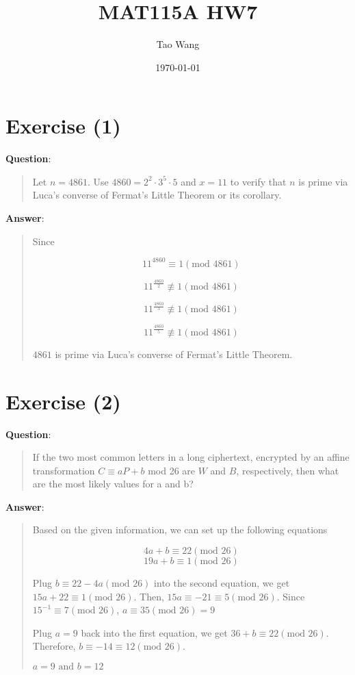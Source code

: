 \documentclass{article} %
\begin{document}
\title{MAT115A HW7}
\author{Tao Wang}
\date{\today}

\maketitle

\section*{Exercise (1)}

\bigskip
\noindent
\textbf{Question}:
\begin{quote}
    Let $n = 4861$. Use $4860 = 2^2 \cdot 3^5 \cdot  5$ and $x = 11$ to verify that $n$ is prime via
    Luca’s converse of Fermat’s Little Theorem or its corollary.
\end{quote}

\bigskip
\noindent
\textbf{Answer}:
\begin{quote}
    Since

    \[11^{4860} \equiv 1(\text{mod }4861)\]

    \[11^{\frac{4860}{2}}\not \equiv 1(\text{mod }4861)\]

    \[11^{\frac{4860}{3}}\not \equiv 1(\text{mod }4861)\]

    \[11^{\frac{4860}{5}}\not \equiv 1(\text{mod }4861)\]

    $4861$ is prime via Luca's converse of Fermat's Little Theorem.
\end{quote}

\section*{Exercise (2)}

\bigskip
\noindent
\textbf{Question}:
\begin{quote}
    If the two most common letters in a long ciphertext, encrypted by an affine
    transformation $C \equiv aP + b$ mod 26 are $W$ and $B$, respectively, then what are
    the most likely values for a and b?
\end{quote}

\bigskip
\noindent
\textbf{Answer}:
\begin{quote}
    Based on the given information, we can set up the following equations

    \[4a + b \equiv 22 (\text{mod }26)\]
    \[19a + b \equiv 1 (\text{mod }26)\]

    Plug $b \equiv 22 - 4a (\text{mod }26)$ into the second equation, we get $15a + 22 \equiv 1(\text{mod }26)$.
    Then, $15a \equiv -21 \equiv 5 (\text{mod }26)$. Since $15^{-1} \equiv 7 (\text{mod }26)$, $a \equiv 35 (\text{mod }26) = 9$

    Plug $a = 9$ back into the first equation, we get $36 + b \equiv 22(\text{mod }26)$. Therefore, $b \equiv -14 \equiv 12 (\text{mod }26)$.

    $\boxed{a = 9} \text{ and } \boxed{b = 12}$
\end{quote}
\end{document}

